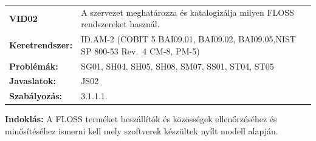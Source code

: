 \documentclass[12pt,magyar,a4paper,oneside]{scrreprt}
\begin{document}
\begin{longtable}[]{@{}ll@{}}
\toprule
\endhead
\begin{minipage}[t]{0.16\columnwidth}\raggedright
\textbf{VID02}\strut
\end{minipage} & \begin{minipage}[t]{0.79\columnwidth}\raggedright
A szervezet meghatározza és katalogizálja milyen FLOSS rendszereket
használ.\strut
\end{minipage}\tabularnewline
\begin{minipage}[t]{0.16\columnwidth}\raggedright
\textbf{Keretrendszer:}\strut
\end{minipage} & \begin{minipage}[t]{0.79\columnwidth}\raggedright
ID.AM-2 (COBIT 5 BAI09.01, BAI09.02, BAI09.05,NIST SP 800-53 Rev.~4
CM-8, PM-5)\strut
\end{minipage}\tabularnewline
\begin{minipage}[t]{0.16\columnwidth}\raggedright
\textbf{Problémák:}\strut
\end{minipage} & \begin{minipage}[t]{0.79\columnwidth}\raggedright
SG01, SH04, SH05, SH08, SM07, SS01, ST04, ST05\strut
\end{minipage}\tabularnewline
\begin{minipage}[t]{0.16\columnwidth}\raggedright
\textbf{Javaslatok:}\strut
\end{minipage} & \begin{minipage}[t]{0.79\columnwidth}\raggedright
JS02\strut
\end{minipage}\tabularnewline
\begin{minipage}[t]{0.16\columnwidth}\raggedright
\textbf{Szabályozás:}\strut
\end{minipage} & \begin{minipage}[t]{0.79\columnwidth}\raggedright
3.1.1.1.\strut
\end{minipage}\tabularnewline
\bottomrule
\end{longtable}

\textbf{Indoklás: } A FLOSS terméket beszállítók és közösségek
ellenőrzéséhez és minősítéséhez ismerni kell mely szoftverek készültek
nyílt modell alapján.
\end{document}
